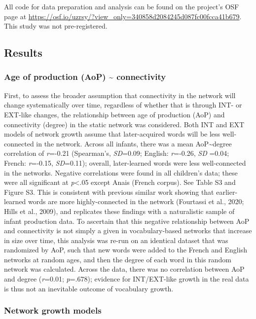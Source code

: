 \documentclass[
  man]{apa6}
\begin{document}
All code for data preparation and analysis can be found on the project's OSF page at \url{https://osf.io/uzrsy/?view_only=340858d2084245d087fc00fcca41b679}. This study was not pre-registered.

\hypertarget{results}{%
\subsection{Results}\label{results}}

\hypertarget{age-of-production-aop-connectivity}{%
\subsubsection{Age of production (AoP) \textasciitilde{} connectivity}\label{age-of-production-aop-connectivity}}

First, to assess the broader assumption that connectivity in the network will change systematically over time, regardless of whether that is through INT- or EXT-like changes, the relationship between age of production (AoP) and connectivity (degree) in the static network was considered. Both INT and EXT models of network growth assume that later-acquired words will be less well-connected in the network. Across all infants, there was a mean AoP\textasciitilde degree correlation of \emph{r}=-0.21 (Spearman's, \emph{SD}=0.09; English: \emph{r}=-0.26, \emph{SD} =0.04; French: \emph{r}=-0.15, \emph{SD}=0.11); overall, later-learned words were less well-connected in the networks. Negative correlations were found in all children's data; these were all significant at \emph{p}\textless.05 except Anais (French corpus). See Table S3 and Figure S3. This is consistent with previous similar work showing that earlier-learned words are more highly-connected in the network (Fourtassi et al., 2020; Hills et al., 2009), and replicates these findings with a naturalistic sample of infant production data. To ascertain that this negative relationship between AoP and connectivity is not simply a given in vocabulary-based networks that increase in size over time, this analysis was re-run on an identical dataset that was randomized by AoP, such that new words were added to the French and English networks at random ages, and then the degree of each word in this random network was calculated. Across the data, there was no correlation between AoP and degree (\emph{r}=0.01; \emph{p}=.678); evidence for INT/EXT-like growth in the real data is thus not an inevitable outcome of vocabulary growth.

\hypertarget{network-growth-models-1}{%
\subsubsection{Network growth models}\label{network-growth-models-1}}
\end{document}
